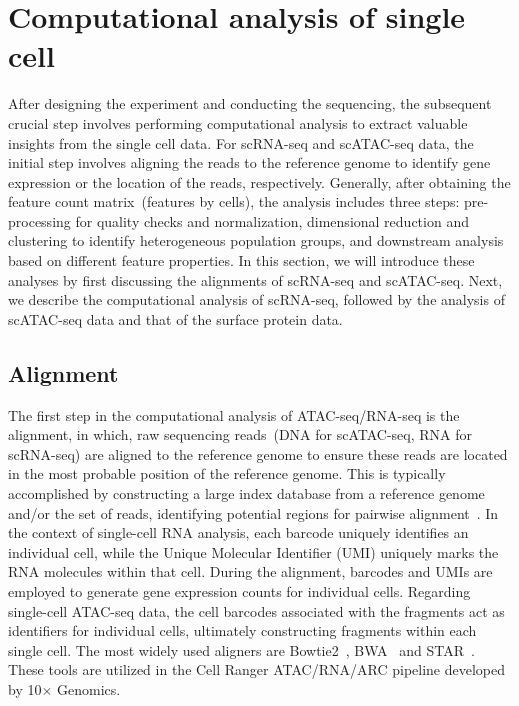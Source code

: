 \section{Computational analysis of single cell}
\label{background:computational_singlecell}
After designing the experiment and conducting the sequencing, the subsequent crucial step involves performing computational analysis to extract valuable insights from the single cell data. For scRNA-seq and scATAC-seq data, the initial step involves aligning the reads to the reference genome to identify gene expression or the location of the reads, respectively. Generally, after obtaining the feature count matrix~(features by cells), the analysis includes three steps: pre-processing for quality checks and normalization, dimensional reduction and clustering to identify heterogeneous population groups, and downstream analysis based on different feature properties. In this section, we will introduce these analyses by first discussing the alignments of scRNA-seq and scATAC-seq. Next, we describe the computational analysis of scRNA-seq, followed by the analysis of scATAC-seq data and that of the surface protein data.

\subsection{Alignment}
\label{background:sec2:alignment}
The first step in the computational analysis of ATAC-seq/RNA-seq is the alignment, in which, raw sequencing reads~(DNA for scATAC-seq, RNA for scRNA-seq) are aligned to the reference genome to ensure these reads are located in the most probable position of the reference genome. This is typically accomplished by constructing a large index database from a reference genome and/or the set of reads, identifying potential regions for pairwise alignment~\citep{alser2021alignment}. In the context of single-cell RNA analysis, each barcode uniquely identifies an individual cell, while the Unique Molecular Identifier (UMI) uniquely marks the RNA molecules within that cell. During the alignment, barcodes and UMIs are employed to generate gene expression counts for individual cells. Regarding single-cell ATAC-seq data, the cell barcodes associated with the fragments act as identifiers for individual cells, ultimately constructing fragments within each single cell. The most widely used aligners are Bowtie2~\citep{langmead2012bowtie2}, BWA~\citep{li2009BWA} and STAR~\citep{dobin2013star}. These tools are utilized in the Cell Ranger ATAC/RNA/ARC pipeline developed by 10$\times$ Genomics.



